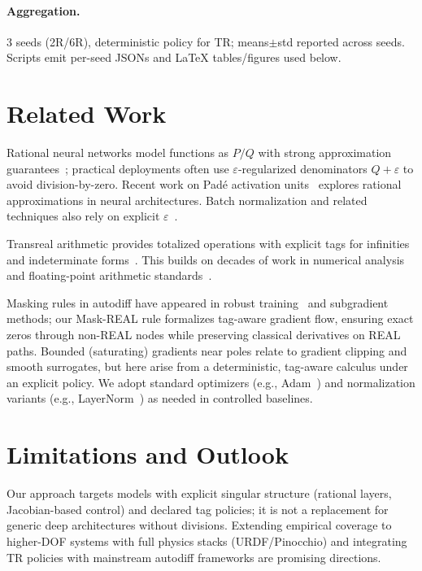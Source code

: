 \documentclass[twoside,11pt]{article}
\begin{document}
\paragraph{Aggregation.} 3 seeds (2R/6R), deterministic policy for TR; means$\pm$std reported across seeds. Scripts emit per-seed JSONs and LaTeX tables/figures used below.

\section*{Related Work}
Rational neural networks model functions as $P/Q$ with strong approximation guarantees~\citep{boulle2020rational,telgarsky2017neural}; practical deployments often use $\varepsilon$-regularized denominators $Q+\varepsilon$ to avoid division-by-zero. Recent work on Padé activation units~\citep{montanher2020pade,molina2020pade} explores rational approximations in neural architectures. Batch normalization and related techniques also rely on explicit $\varepsilon$~\citep{ioffe2015batchnorm}. 

Transreal arithmetic provides totalized operations with explicit tags for infinities and indeterminate forms~\citep{reis2016transreal,anderson2019transmathematics,anderson2006perspex}. This builds on decades of work in numerical analysis~\citep{higham2002accuracy,muller2010handbook} and floating-point arithmetic standards~\citep{ieee754-2019,goldberg1991every}.

Masking rules in autodiff have appeared in robust training~\citep{pascanu2013difficulty} and subgradient methods; our Mask-REAL rule formalizes tag-aware gradient flow, ensuring exact zeros through non-REAL nodes while preserving classical derivatives on REAL paths. Bounded (saturating) gradients near poles relate to gradient clipping and smooth surrogates, but here arise from a deterministic, tag-aware calculus under an explicit policy. We adopt standard optimizers (e.g., Adam~\citep{kingma2015adam}) and normalization variants (e.g., LayerNorm~\citep{ba2016layernorm}) as needed in controlled baselines.

\section*{Limitations and Outlook}
Our approach targets models with explicit singular structure (rational layers, Jacobian-based control) and declared tag policies; it is not a replacement for generic deep architectures without divisions. Extending empirical coverage to higher-DOF systems with full physics stacks (URDF/Pinocchio) and integrating TR policies with mainstream autodiff frameworks are promising directions.
\end{document}

